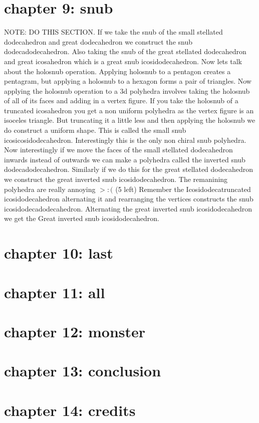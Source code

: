 \documentclass{article}
\begin{document}
\section*{chapter 9: snub}
NOTE: DO THIS SECTION.
If we take the snub of the small stellated dodecahedron and great dodecahedron we construct the snub dodecadodecahedron. Also taking the snub of the great stellated dodecahedron and great icosahedron which is a great snub icosidodecahedron. Now lets talk about the holosnub operation. Applying holosnub to a pentagon creates a pentagram, but applying a holosnub to a hexagon forms a pair of triangles. Now applying the holosnub operation to a 3d polyhedra involves taking the holosnub of all of its faces and adding in a vertex figure. If you take the holosnub of a truncated icosahedron you get a non uniform polyhedra as the vertex figure is an isoceles triangle. But truncating it a little less and then applying the holosnub we do construct a uniform shape. This is called the small snub icosicosidodecahedron. Interestingly this is the only non chiral snub polyhedra. Now interestingly if we move the faces of the small stellated dodecahedron inwards instead of outwards we can make a polyhedra called the inverted snub dodecadodecahedron. Similarly if we do this for the great stellated dodecahedron we construct the great inverted snub icosidodecahedron. The remanining polyhedra are really annoying $>:($ (5 left) 
Remember the Icosidodecatruncated icosidodecahedron alternating it and rearranging the vertices constructs the snub icosidodecadodecahedron.  Alternating the great inverted snub icosidodecahedron we get the Great inverted snub icosidodecahedron.
\section*{chapter 10: last}
\section*{chapter 11: all}
\section*{chapter 12: monster}
\section*{chapter 13: conclusion}
\section*{chapter 14: credits}
\newpage
\theendnotes
\end{document}
